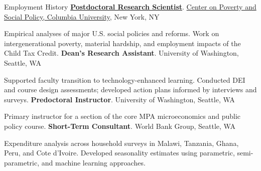 \begin{rubric}{Employment History}
\entry*[2021 - 2022]%
    \textbf{\href{https://povertycenter.columbia.edu/people}{Postdoctoral Research Scientist}}. \href{https://povertycenter.columbia.edu/people}{Center on Poverty and Social Policy, Columbia University}, New York, NY
    \par Empirical analyses of major U.S. social policies and reforms. Work on intergenerational poverty, material hardship, and employment impacts of the Child Tax Credit.
\entry*[2020 - 2021]%
    \textbf{Dean's Research Assistant}. University of Washington, Seattle, WA
    \par Supported faculty transition to technology-enhanced learning. Conducted DEI and course design assessments; developed action plans informed by interviews and surveys.
\entry*[2020]%
    \textbf{Predoctoral Instructor}. University of Washington, Seattle, WA
    \par Primary instructor for a section of the core MPA microeconomics and public policy course.
\entry*[2018]%
    \textbf{Short-Term Consultant}. World Bank Group, Seattle, WA
    \par Expenditure analysis across household surveys in Malawi, Tanzania, Ghana, Peru, and Cote d'Ivoire. Developed seasonality estimates using parametric, semi-parametric, and machine learning approaches.
\end{rubric}

